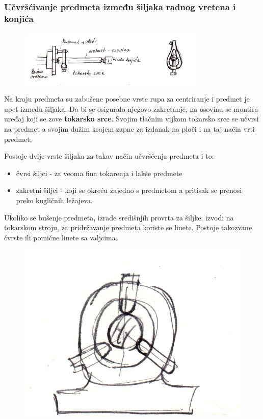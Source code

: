 \documentclass[a4paper,12pt]{article}
\numberwithin{figure}{section}
\begin{document}
\subsubsection{Učvršćivanje predmeta između šiljaka radnog vretena i konjića}
\begin{figure}[!h]
\centering
\includegraphics[width=0.8\textwidth]{image_18-1.png}
\end{figure}
\FloatBarrier
\par
Na kraju predmeta su zabušene posebne vrste rupa za centriranje i predmet je upet između šiljaka. Da bi se osiguralo njegovo zakretanje, na osovinu se montira uređaj koji se zove \textbf{tokarsko srce}. Svojim tlačnim vijkom tokarsko srce se učvrsi na predmet a svojim dužim krajem zapne za izdanak na ploči i na taj način vrti predmet.\par
Postoje dvije vrste šiljaka za takav način učvršćenja predmeta i to:
\begin{itemize}
\item čvrsi šiljci - za veoma fina tokarenja i lakše predmete
\item zakretni šiljci - koji se okreću zajedno s predmetom a pritisak se prenosi preko kugličnih ležajeva.
\end{itemize}
Ukoliko se bušenje predmeta, izrade središnjih provrta za šiljke, izvodi na tokarskom stroju, za pridržavanje predmeta koriste se linete. Postoje takozvane čvrste ili pomične linete sa valjcima.
\begin{figure}[!h]
\centering
\includegraphics[scale=0.1]{image_18-2.png}
\end{figure}
\clearpage
\end{document}

